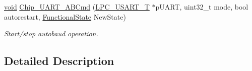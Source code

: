 \begin{DoxyCompactItemize}
\hyperlink{Paradigm_2Tern__EE_2small_2portmacro_8h_a14d32f8130d3c0b212cfc751730b5b49}{void} \hyperlink{group__UART__17XX__40XX_ga9aa733f176891043bb1dd4d87940187f}{Chip\-\_\-\-U\-A\-R\-T\-\_\-\-A\-B\-Cmd} (\hyperlink{structLPC__USART__T}{L\-P\-C\-\_\-\-U\-S\-A\-R\-T\-\_\-\-T} $\ast$p\-U\-A\-R\-T, uint32\-\_\-t mode, bool autorestart, \hyperlink{group__LPC__Types__Public__Types_gac9a7e9a35d2513ec15c3b537aaa4fba1}{Functional\-State} New\-State)
\begin{DoxyCompactList}\small\item\em Start/stop autobaud operation. \end{DoxyCompactList}\end{DoxyCompactItemize}


\subsection{Detailed Description}


